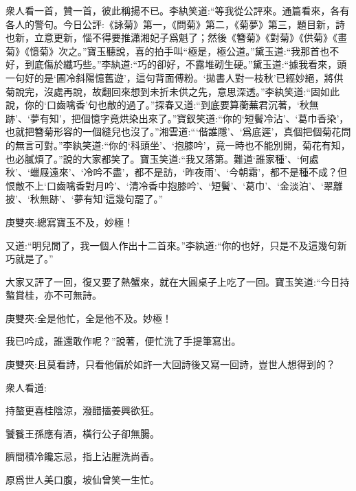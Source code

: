 \begin{parag}
    衆人看一首，贊一首，彼此稱揚不已。李紈笑道:“等我從公評來。通篇看來，各有各人的警句。今日公評:《詠菊》第一，《問菊》第二，《菊夢》第三，題目新，詩也新，立意更新，惱不得要推瀟湘妃子爲魁了；然後《簪菊》《對菊》《供菊》《畫菊》《憶菊》次之。”寶玉聽說，喜的拍手叫“極是，極公道。”黛玉道:“我那首也不好，到底傷於纖巧些。”李紈道:“巧的卻好，不露堆砌生硬。”黛玉道:“據我看來，頭一句好的是‘圃冷斜陽憶舊遊’，這句背面傅粉。‘拋書人對一枝秋’已經妙絕，將供菊說完，沒處再說，故翻回來想到未折未供之先，意思深透。”李紈笑道:“固如此說，你的‘口齒噙香’句也敵的過了。”探春又道:“到底要算蘅蕪君沉著，‘秋無跡’、‘夢有知’，把個憶字竟烘染出來了。”寶釵笑道:“你的‘短鬢冷沾’、‘葛巾香染’，也就把簪菊形容的一個縫兒也沒了。”湘雲道:“‘偕誰隱’、‘爲底遲’，真個把個菊花問的無言可對。”李紈笑道:“你的‘科頭坐’、‘抱膝吟’，竟一時也不能別開，菊花有知，也必膩煩了。”說的大家都笑了。寶玉笑道:“我又落第。難道‘誰家種’、‘何處秋’、‘蠟屐遠來’、‘冷吟不盡’，都不是訪，‘昨夜雨’、‘今朝霜’，都不是種不成？但恨敵不上‘口齒噙香對月吟’、‘清冷香中抱膝吟’、‘短鬢’、‘葛巾’、‘金淡泊’、‘翠離披’、‘秋無跡’、‘夢有知’這幾句罷了。”\begin{note}庚雙夾:總寫寶玉不及，妙極！\end{note}又道:“明兒閒了，我一個人作出十二首來。”李紈道:“你的也好，只是不及這幾句新巧就是了。”
\end{parag}


\begin{parag}
    大家又評了一回，復又要了熱蟹來，就在大圓桌子上吃了一回。寶玉笑道:“今日持螯賞桂，亦不可無詩。\begin{note}庚雙夾:全是他忙，全是他不及。妙極！\end{note}我已吟成，誰還敢作呢？”說著，便忙洗了手提筆寫出。\begin{note}庚雙夾:且莫看詩，只看他偏於如許一大回詩後又寫一回詩，豈世人想得到的？\end{note}衆人看道:
\end{parag}


\begin{poem}
    \begin{pl}持螯更喜桂陰涼，潑醋擂姜興欲狂。\end{pl}

    \begin{pl}饕餮王孫應有酒，橫行公子卻無腸。\end{pl}

    \begin{pl}臍間積冷饞忘忌，指上沾腥洗尚香。\end{pl}

    \begin{pl}原爲世人美口腹，坡仙曾笑一生忙。\end{pl}


\end{poem}


